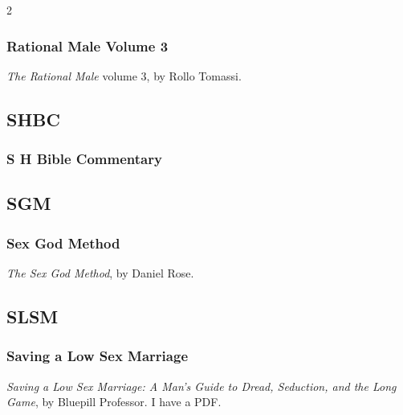 \begin{multicols}{2}
		\subsubsection*{Rational Male Volume 3}
		
			\textit{The Rational Male} volume 3, by Rollo Tomassi.
		
	\subsection*{SHBC}
	
		\subsubsection*{S H Bible Commentary}
		
	\subsection*{SGM}
	
		\subsubsection*{Sex God Method}
		
			\textit{The Sex God Method}, by Daniel Rose.
		
	\subsection*{SLSM}
	
		\subsubsection*{Saving a Low Sex Marriage}
		
			\textit{Saving a Low Sex Marriage: A Man's Guide to Dread, Seduction, and the Long Game}, by Bluepill Professor. I have a PDF.
			

\end{multicols}
